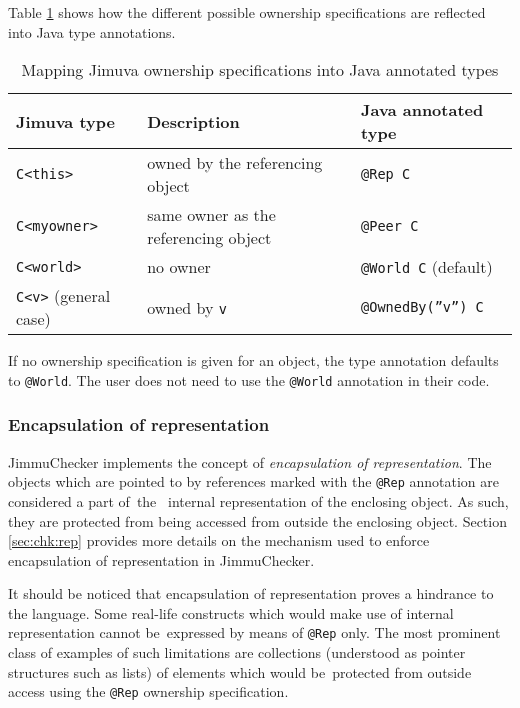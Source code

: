 \documentclass{pracamgr}
\theoremstyle{break}
\theoremstyle{break}
\theoremstyle{break}
\begin{document}
Table \ref{tab:mapping-owner} shows how the different possible
ownership specifications are reflected into Java type annotations.
\begin{table}
  \centering
  \begin{tabular}{|l|l|l|}
    \hline
    \textbf{Jimuva type} & \textbf{Description} & \textbf{Java annotated type} \\
    \hline \hline 
    \texttt{C<this>} & owned by the referencing object & \texttt{@Rep C} \\
    \texttt{C<myowner>} & same owner as the referencing object & \texttt{@Peer C} \\
    \texttt{C<world>} & no owner & \texttt{@World C} (default) \\
    \texttt{C<v>} (general case) & owned by \texttt{v} & \texttt{@OwnedBy(''v'') C} \\
    \hline
  \end{tabular}
  \caption{Mapping Jimuva ownership specifications into Java annotated types}
  \label{tab:mapping-owner}
\end{table}
If no ownership specification is given for an object, the type
annotation defaults to \texttt{@World}. The user does not need to use
the \texttt{@World} annotation in their code.

\subsubsection{Encapsulation of representation}
\label{sec:mod:encap}

JimmuChecker implements the concept of \emph{encapsulation of
  representation}. The objects which are pointed to by references
marked with the \texttt{@Rep} annotation are considered a part of~the~
internal representation of the enclosing object. As such, they are
protected from being accessed from outside the enclosing
object. Section \ref{sec:chk:rep} provides more details on the
mechanism used to enforce encapsulation of representation in
JimmuChecker. 

It should be noticed that encapsulation of representation proves a
hindrance to the language. Some real-life constructs which would make
use of internal representation cannot be~expressed by means of
\texttt{@Rep} only. The most prominent class of examples of such
li\-mi\-ta\-tions are collections (understood as pointer structures
such as lists) of elements which would be~protected from outside
access using the \texttt{@Rep} ownership specification.
\end{document}

